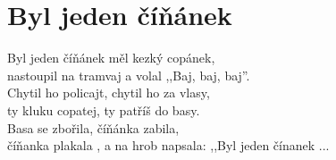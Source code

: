 
\chapter{Byl jeden \texorpdfstring{č}{c}í\texorpdfstring{ň}{n}ánek}
\label{priloha:cinanek}

Byl jeden číňánek měl kezký copánek, \\
nastoupil na tramvaj a volal ,,Baj, baj, baj''. \\
Chytil ho policajt, chytil ho za vlasy,  \\
ty kluku copatej, ty patříš do basy.  \\
Basa se zbořila, číňánka zabila, \\
číňanka plakala , a na hrob napsala: ,,Byl jeden čínanek ...